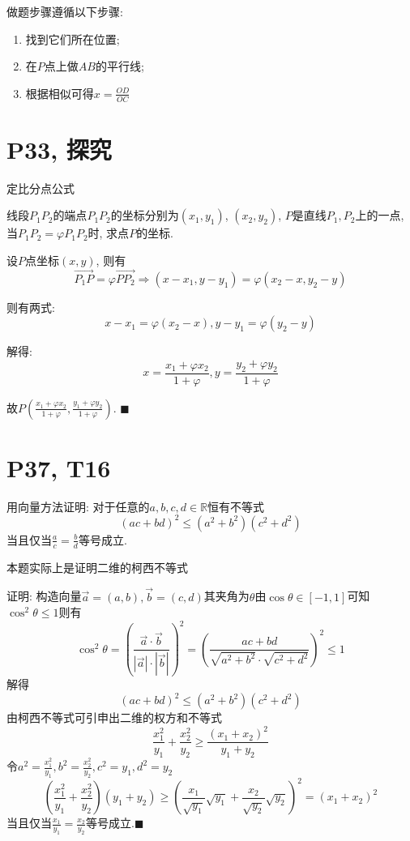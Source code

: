 \documentclass{book}
\begin{document}
    做题步骤遵循以下步骤:
    \begin{enumerate}
        \item 找到它们所在位置;
        \item 在$P$点上做$AB$的平行线;
        \item 根据相似可得$\displaystyle x=\frac{OD}{OC}$
    \end{enumerate}

    \section{\textcolor[rgb]{0.11,0.65,0.52}{P33, 探究}}

    \begin{boxB}
        定比分点公式

        线段$P_1P_2$的端点$P_1P_2$的坐标分别为$(x_1,y_1)$, $(x_2,y_2)$, $P$是直线$P_1,P_2$上的一点, 当$P_1P_2=\varphi P_1P_2$时, 求点$P$的坐标.
    \end{boxB}
    设$P$点坐标$(x,y)$, 则有$$\overrightarrow{P_1P}=\varphi \overrightarrow{PP_2}\Longrightarrow (x-x_1,y-y_1)=\varphi(x_2-x, y_2-y)$$

    则有两式: $$x-x_1=\varphi (x_2-x),y-y_1=\varphi (y_2-y)$$

    解得:$$x=\frac{x_1+\varphi x_2}{1+\varphi},y=\frac{y_2+\varphi y_2}{1+\varphi}$$

    故$\displaystyle P(\frac{x_1+\varphi x_2}{1+\varphi},\frac{y_1+\varphi y_2}{1+\varphi})$. $\blacksquare$

    \section{\textcolor[rgb]{0.11,0.65,0.52}{P37, T16}}
    \begin{boxB}
        用向量方法证明: 对于任意的$a,b,c,d \in \mathbb{R}$恒有不等式$$(ac+bd)^2\le(a^2+b^2)(c^2+d^2)$$
        当且仅当$\displaystyle \frac{a}{c}=\frac{b}{d}$等号成立.
    \end{boxB}

    本题实际上是证明\textcolor[rgb]{0.38,0.11,0.2}{二维的柯西不等式}

    证明: 构造向量$\overrightarrow{a}=(a,b),\overrightarrow{b}=(c,d)$其夹角为$\theta$由$\cos \theta \in [-1,1]$可知$\cos ^2 \theta \le 1$则有$$\cos ^2 \theta=\left (\frac{\overrightarrow{a}\cdot \overrightarrow{b}}{|\overrightarrow{a}|\cdot |\overrightarrow{b}|}\right ) ^2=\left ( \frac{ac+bd}{\sqrt{a^2+b^2}\cdot \sqrt{c^2+d^2}} \right )^2 \le 1$$
    解得$$(ac+bd)^2 \le (a^2+b^2)(c^2+d^2)$$
    由\textcolor[rgb]{0.38,0.11,0.2}{柯西不等式}可引申出\textcolor[rgb]{0.38,0.11,0.2}{二维的权方和不等式}$$\frac{x_1^2}{y_1}+\frac{x_2^2}{y_2}\ge \frac{(x_1+x_2)^2}{y_1+y_2}$$
    令$\displaystyle a^2=\frac{x_1^2}{y_1},b^2=\frac{x_2^2}{y_2},c^2=y_1,d^2=y_2$
    $$\left ( \frac{x_1^2}{y_1}+\frac{x_2^2}{y_2} \right )(y_1+y_2)\ge \left ( \frac{x_1}{\sqrt{y_1}}\sqrt{y_1}+\frac{x_2}{\sqrt{y_2}}\sqrt{y_2} \right )^2=(x_1+x_2)^2$$
    当且仅当$\displaystyle \frac{x_1}{y_1}=\frac{x_2}{y_2}$等号成立.$\blacksquare$
\end{document}
